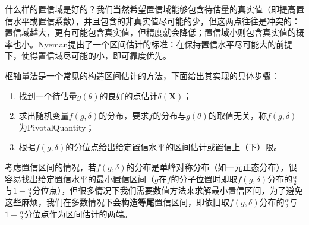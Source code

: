 \begin{note}
	什么样的置信域是好的？我们当然希望置信域能够包含待估量的真实值（即提高置信水平或置信系数），并且包含的非真实值尽可能的少，但这两点往往是冲突的：置信域越大，更有可能包含真实值，但精度就会降低；置信域小则包含真实值的概率也小。Nyeman提出了一个区间估计的标准：在保持置信水平尽可能大的前提下，使得置信域尽可能的小，即可靠度优先。
\end{note}
\begin{note}[枢轴量法]
	枢轴量法是一个常见的构造区间估计的方法，下面给出其实现的具体步骤：
	\begin{enumerate}
		\item 找到一个待估量$g(\theta)$的良好的点估计$\delta(\mathbf{X})$；
		\item 求出随机变量$f(g,\delta)$的分布，要求$f$的分布与$g(\theta)$的取值无关，称$f(g,\delta)$为\gls{PivotalQuantity}；
		\item 根据$f(g,\delta)$的分位点给出给定置信水平的区间估计或置信上（下）限。
	\end{enumerate}
	考虑置信区间的情况，若$f(g,\delta)$的分布是单峰对称分布（如一元正态分布），很容易找出给定置信水平的最小置信区间（$g$在$f$的分子位置时即取$f(g,\delta)$分布的$\frac{\alpha}{2}$与$1-\frac{\alpha}{2}$分位点），但很多情况下我们需要数值方法来求解最小置信区间，为了避免这些麻烦，我们在多数情况下会构造\textbf{等尾}置信区间，即依旧取$f(g,\delta)$分布的$\frac{\alpha}{2}$与$1-\frac{\alpha}{2}$分位点作为区间估计的两端。
\end{note}
